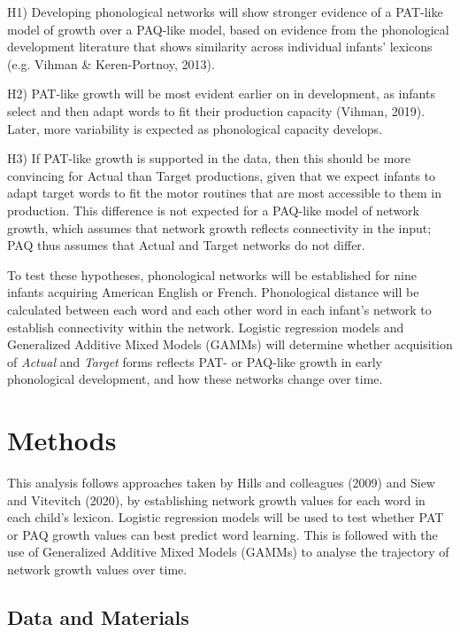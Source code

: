 \documentclass[
  man,mask,floatsintext]{apa6}
\begin{document}
H1) Developing phonological networks will show stronger evidence of a PAT-like model of growth over a PAQ-like model, based on evidence from the phonological development literature that shows similarity across individual infants' lexicons (e.g. Vihman \& Keren-Portnoy, 2013).

H2) PAT-like growth will be most evident earlier on in development, as infants select and then adapt words to fit their production capacity (Vihman, 2019). Later, more variability is expected as phonological capacity develops.

H3) If PAT-like growth is supported in the data, then this should be more convincing for Actual than Target productions, given that we expect infants to adapt target words to fit the motor routines that are most accessible to them in production. This difference is not expected for a PAQ-like model of network growth, which assumes that network growth reflects connectivity in the input; PAQ thus assumes that Actual and Target networks do not differ.

To test these hypotheses, phonological networks will be established for nine infants acquiring American English or French. Phonological distance will be calculated between each word and each other word in each infant's network to establish connectivity within the network. Logistic regression models and Generalized Additive Mixed Models (GAMMs) will determine whether acquisition of \emph{Actual} and \emph{Target} forms reflects PAT- or PAQ-like growth in early phonological development, and how these networks change over time.

\hypertarget{methods}{%
\section{Methods}\label{methods}}

This analysis follows approaches taken by Hills and colleagues (2009) and Siew and Vitevitch (2020), by establishing network growth values for each word in each child's lexicon. Logistic regression models will be used to test whether PAT or PAQ growth values can best predict word learning. This is followed with the use of Generalized Additive Mixed Models (GAMMs) to analyse the trajectory of network growth values over time.

\hypertarget{data-and-materials}{%
\subsection{Data and Materials}\label{data-and-materials}}
\end{document}
